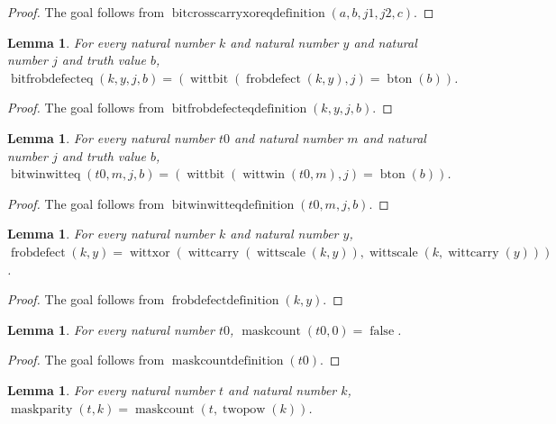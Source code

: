 \documentclass[11pt]{article}
\newtheorem{lemma}[theorem]{Lemma}
\theoremstyle{definition}
\begin{document}
\begin{proof}
The goal follows from \(\operatorname{bitcrosscarryxoreqdefinition}(a, b, j1, j2, c)\).
\end{proof}
\begin{lemma}
\label{ll:observations:bit-frob-defect-eq-definition}
For every natural number \(k\) and natural number \(y\) and natural number \(j\) and truth value \(b\), \(\operatorname{bitfrobdefecteq}(k, y, j, b) = (\operatorname{wittbit}(\operatorname{frobdefect}(k, y), j) = \operatorname{bton}(b))\).
\end{lemma}
\begin{proof}
The goal follows from \(\operatorname{bitfrobdefecteqdefinition}(k, y, j, b)\).
\end{proof}
\begin{lemma}
\label{ll:observations:bit-win-witt-eq-definition}
For every natural number \(t0\) and natural number \(m\) and natural number \(j\) and truth value \(b\), \(\operatorname{bitwinwitteq}(t0, m, j, b) = (\operatorname{wittbit}(\operatorname{wittwin}(t0, m), j) = \operatorname{bton}(b))\).
\end{lemma}
\begin{proof}
The goal follows from \(\operatorname{bitwinwitteqdefinition}(t0, m, j, b)\).
\end{proof}
\begin{lemma}
\label{ll:observations:frob-defect-definition}
For every natural number \(k\) and natural number \(y\), \(\operatorname{frobdefect}(k, y) = \operatorname{wittxor}(\operatorname{wittcarry}(\operatorname{wittscale}(k, y)), \operatorname{wittscale}(k, \operatorname{wittcarry}(y)))\).
\end{lemma}
\begin{proof}
The goal follows from \(\operatorname{frobdefectdefinition}(k, y)\).
\end{proof}
\begin{lemma}
\label{ll:observations:maskcount-definition}
For every natural number \(t0\), \(\operatorname{maskcount}(t0, 0) = \operatorname{false}\).
\end{lemma}
\begin{proof}
The goal follows from \(\operatorname{maskcountdefinition}(t0)\).
\end{proof}
\begin{lemma}
\label{ll:observations:maskparity-definition}
For every natural number \(t\) and natural number \(k\), \(\operatorname{maskparity}(t, k) = \operatorname{maskcount}(t, \operatorname{twopow}(k))\).
\end{lemma}
\end{document}
